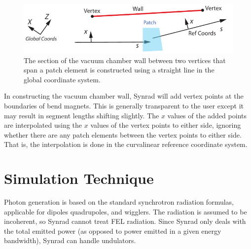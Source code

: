 \documentclass[11pt]{article}
\begin{document}

  \begin{figure}[tb]
  \begin{center}
  \includegraphics[width=5in]{patch.pdf}
  \caption{
The section of the vacuum chamber wall between two
vertices that span a patch element is constructed using
a straight line in the global coordinate system.
  }
  \label{f:patch}
  \end{center}
  \end{figure}


In constructing the vacuum chamber wall, Synrad will add vertex points
at the boundaries of bend magnets. This is generally transparent to
the user except it may result in segment lengths shifting slightly.
The $x$ values of the added points are interpolated using the $x$
values of the vertex points to either side, ignoring whether there are
any patch elements between the vertex points to either side. That is,
the interpolation is done in the curvalinear reference coordinate
system.

\section{Simulation Technique} 

Photon generation is based on the standard synchrotron radiation
formulas, applicable for dipoles quadrupoles, and wigglers. The
radiation is assumed to be incoherent, so Synrad cannot treat FEL
radiation. Since Synrad only deals with the total emitted power (as
opposed to power emitted in a given energy bandwidth), Synrad can
handle undulators.
\end{document}
